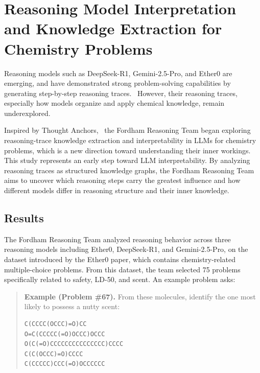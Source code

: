 






\section{Reasoning Model Interpretation and Knowledge Extraction for Chemistry Problems}

Reasoning models such as DeepSeek-R1, Gemini-2.5-Pro, and Ether0 are emerging, and have demonstrated strong problem-solving capabilities by generating step-by-step reasoning traces.~\cite{Guo2025-kn,narayanan2025trainingscientificreasoningmodel} However, their reasoning traces, especially how models organize and apply chemical knowledge, remain underexplored.

Inspired by Thought Anchors,~\cite{bogdan2025thoughtanchorsllmreasoning} the Fordham Reasoning Team began exploring reasoning-trace knowledge extraction and interpretability in LLMs for chemistry problems, which is a new direction toward understanding their inner workings. This study represents an early step toward LLM interpretability. By analyzing reasoning traces as structured knowledge graphs, the Fordham Reasoning Team aims to uncover which reasoning steps carry the greatest influence and how different models differ in reasoning structure and their inner knowledge.

\subsection*{Results}

The Fordham Reasoning Team analyzed reasoning behavior across three reasoning models including Ether0, DeepSeek-R1, and Gemini-2.5-Pro, on the dataset introduced by the Ether0 paper, which contains chemistry-related multiple-choice problems. From this dataset, the team selected 75 problems specifically related to safety, LD-50, and scent. An example problem asks:
\begin{quote}
\textbf{Example (Problem \#67).} From these molecules, identify the one most likely to possess a nutty scent:
\begin{verbatim}
C(CCCC(OCCC)=O)CC
O=C(CCCCC(=O)OCCC)OCCC
O(C(=O)CCCCCCCCCCCCCCC)CCCC
C(C(OCCC)=O)CCCC
C(CCCCC)CCC(=O)OCCCCCC
\end{verbatim}
\end{quote}

